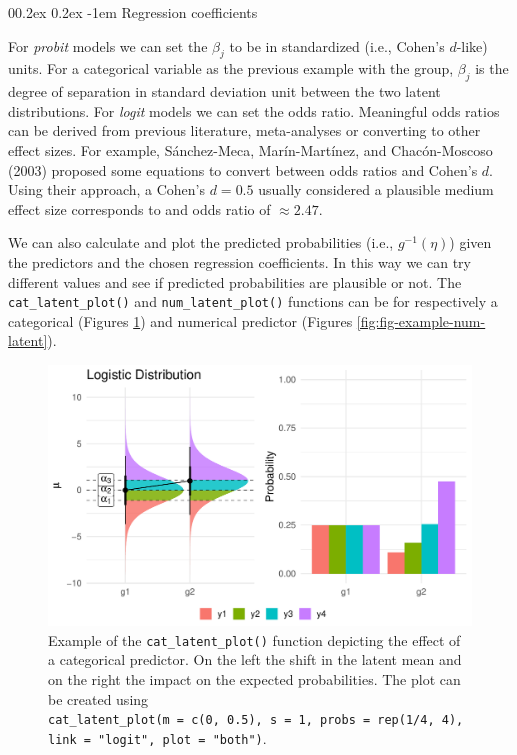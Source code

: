 \documentclass[
  man, mask,floatsintext]{apa6}
\makeatletter
\let\oldparagraph\paragraph
\renewcommand{\paragraph}[1]{\oldparagraph{#1}\mbox{}}
\renewcommand{\paragraph}{\@startsection{paragraph}{4}{\parindent}%
  {0\baselineskip \@plus 0.2ex \@minus 0.2ex}%
  {-1em}%
  {\normalfont\normalsize\bfseries\itshape\typesectitle}}
\makeatother
\begin{document}
\paragraph{Regression coefficients}\label{regression-coefficients}

For \emph{probit} models we can set the \(\beta_j\) to be in standardized (i.e., Cohen's \(d\)-like) units. For a categorical variable as the previous example with the group, \(\beta_j\) is the degree of separation in standard deviation unit between the two latent distributions. For \emph{logit} models we can set the odds ratio. Meaningful odds ratios can be derived from previous literature, meta-analyses or converting to other effect sizes. For example, Sánchez-Meca, Marín-Martínez, and Chacón-Moscoso (2003) proposed some equations to convert between odds ratios and Cohen's \(d\). Using their approach, a Cohen's \(d = 0.5\) usually considered a plausible medium effect size corresponds to and odds ratio of \(\approx 2.47\).

We can also calculate and plot the predicted probabilities (i.e., \(g^{-1}(\eta)\)) given the predictors and the chosen regression coefficients. In this way we can try different values and see if predicted probabilities are plausible or not. The \texttt{cat\_latent\_plot()} and \texttt{num\_latent\_plot()} functions can be for respectively a categorical (Figures \ref{fig:fig-example-cat-latent}) and numerical predictor (Figures \ref{fig:fig-example-num-latent}).

\scriptsize

\begin{figure}

{\centering \includegraphics[width=1\linewidth]{paper_files/figure-latex/fig-example-cat-latent-1} 

}

\caption{Example of the \texttt{cat\_latent\_plot()} function depicting the effect of a categorical predictor. On the left the shift in the latent mean and on the right the impact on the expected probabilities. The plot can be created using \texttt{cat\_latent\_plot(m\ =\ c(0,\ 0.5),\ s\ =\ 1,\ probs\ =\ rep(1/4,\ 4),\ link\ =\ "logit",\ plot\ =\ "both")}.}\label{fig:fig-example-cat-latent}
\end{figure}
\end{document}
